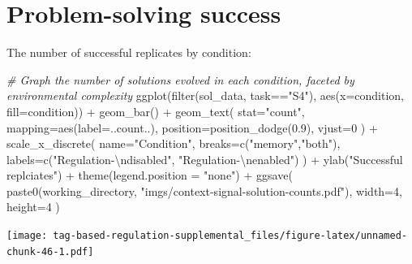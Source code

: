 \documentclass[
]{book}
\newenvironment{Shaded}{\begin{snugshade}}{\end{snugshade}}
\newcommand{\AttributeTok}[1]{\textcolor[rgb]{0.77,0.63,0.00}{#1}}
\newcommand{\CommentTok}[1]{\textcolor[rgb]{0.56,0.35,0.01}{\textit{#1}}}
\newcommand{\DecValTok}[1]{\textcolor[rgb]{0.00,0.00,0.81}{#1}}
\newcommand{\FloatTok}[1]{\textcolor[rgb]{0.00,0.00,0.81}{#1}}
\newcommand{\FunctionTok}[1]{\textcolor[rgb]{0.00,0.00,0.00}{#1}}
\newcommand{\NormalTok}[1]{#1}
\newcommand{\SpecialCharTok}[1]{\textcolor[rgb]{0.00,0.00,0.00}{#1}}
\newcommand{\StringTok}[1]{\textcolor[rgb]{0.31,0.60,0.02}{#1}}
\begin{document}
\hypertarget{problem-solving-success-1}{%
\section{Problem-solving success}\label{problem-solving-success-1}}

The number of successful replicates by condition:

\begin{Shaded}
\begin{Highlighting}[]
\CommentTok{\# Graph the number of solutions evolved in each condition, faceted by environmental complexity}
\FunctionTok{ggplot}\NormalTok{(}\FunctionTok{filter}\NormalTok{(sol\_data, task}\SpecialCharTok{==}\StringTok{"S4"}\NormalTok{), }\FunctionTok{aes}\NormalTok{(}\AttributeTok{x=}\NormalTok{condition, }\AttributeTok{fill=}\NormalTok{condition)) }\SpecialCharTok{+}
  \FunctionTok{geom\_bar}\NormalTok{() }\SpecialCharTok{+}
  \FunctionTok{geom\_text}\NormalTok{(}
    \AttributeTok{stat=}\StringTok{"count"}\NormalTok{,}
    \AttributeTok{mapping=}\FunctionTok{aes}\NormalTok{(}\AttributeTok{label=}\NormalTok{..count..),}
    \AttributeTok{position=}\FunctionTok{position\_dodge}\NormalTok{(}\FloatTok{0.9}\NormalTok{),}
    \AttributeTok{vjust=}\DecValTok{0}
\NormalTok{  ) }\SpecialCharTok{+}
  \FunctionTok{scale\_x\_discrete}\NormalTok{(}
    \AttributeTok{name=}\StringTok{"Condition"}\NormalTok{,}
    \AttributeTok{breaks=}\FunctionTok{c}\NormalTok{(}\StringTok{"memory"}\NormalTok{,}\StringTok{"both"}\NormalTok{),}
    \AttributeTok{labels=}\FunctionTok{c}\NormalTok{(}\StringTok{"Regulation{-}}\SpecialCharTok{\textbackslash{}n}\StringTok{disabled"}\NormalTok{, }\StringTok{"Regulation{-}}\SpecialCharTok{\textbackslash{}n}\StringTok{enabled"}\NormalTok{)}
\NormalTok{  ) }\SpecialCharTok{+}
  \FunctionTok{ylab}\NormalTok{(}\StringTok{"Successful replciates"}\NormalTok{) }\SpecialCharTok{+}
  \FunctionTok{theme}\NormalTok{(}\AttributeTok{legend.position =} \StringTok{"none"}\NormalTok{) }\SpecialCharTok{+}
  \FunctionTok{ggsave}\NormalTok{(}
    \FunctionTok{paste0}\NormalTok{(working\_directory, }\StringTok{"imgs/context{-}signal{-}solution{-}counts.pdf"}\NormalTok{),}
    \AttributeTok{width=}\DecValTok{4}\NormalTok{,}
    \AttributeTok{height=}\DecValTok{4}
\NormalTok{  )}
\end{Highlighting}
\end{Shaded}

\texttt{[image: tag-based-regulation-supplemental\_files/figure-latex/unnamed-chunk-46-1.pdf]}
\end{document}
